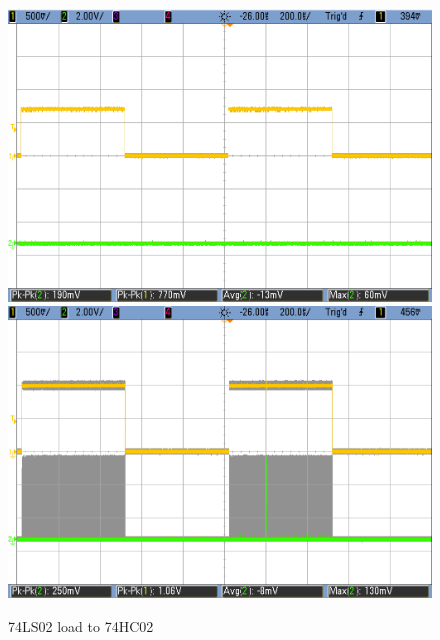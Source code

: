 \begin{figure}[h!]
         \includegraphics[scale=0.19]{../Exercise2/LS-HC-0p7V.png}\\
        \vspace{0.2cm}
        \includegraphics[scale=0.19]{../Exercise2/LS-HC-1V.png}
        \caption{\color{cyan}74LS02 load to 74HC02}
        \label{fig:ej2exlstohc}
    \end{figure}
    
